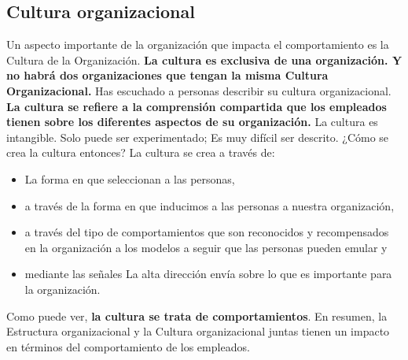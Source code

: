 \documentclass[10pt]{book}
\begin{document}
\subsection{Cultura organizacional}
Un aspecto importante de la organización que impacta el comportamiento es la Cultura de la Organización. \textbf{La cultura es exclusiva de una organización. Y no habrá dos organizaciones que tengan la misma Cultura Organizacional.} Has escuchado a personas describir su cultura organizacional. \textbf{La cultura se refiere a la comprensión compartida que los empleados tienen sobre los diferentes aspectos de su organización.} La cultura es intangible. Solo puede ser experimentado; Es muy difícil ser descrito. ¿Cómo se crea la cultura entonces? La cultura se crea a través de:
\begin{itemize}
\item La forma en que seleccionan a las personas,
\item a través de la forma en que inducimos a las personas a nuestra organización,
\item a través del tipo de comportamientos que son reconocidos y recompensados en la organización a los modelos a seguir que las personas pueden emular y 
\item mediante las señales La alta dirección envía sobre lo que es importante para la organización.
\end{itemize}
Como puede ver, \textbf{la cultura se trata de comportamientos}. En resumen, la Estructura organizacional y la Cultura organizacional juntas tienen un impacto en términos del comportamiento de los empleados.
\end{document}
